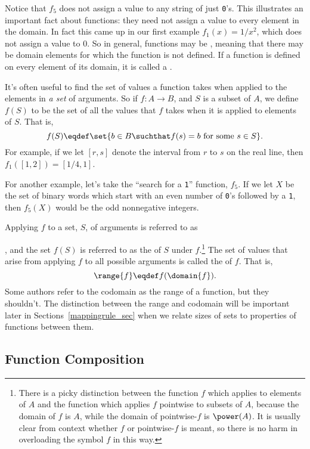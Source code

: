 Notice that $f_5$ does not assign a value to any string of just \texttt{0}'s.
This illustrates an important fact about functions: they need not assign a
value to every element in the domain.  In fact this came up in our first
example $f_1(x)=1/x^2$, which does not assign a value to $0$.  So in
general, functions may be , meaning that there may be domain
elements for which the function is not defined.  If a function is defined
on every element of its domain, it is called a .

It's often useful to find the set of values a function takes when applied
to the elements in \emph{a set} of arguments.  So if $f:A \to B$, and $S$
is a subset of $A$, we define $f(S)$ to be the set of all the values that
$f$ takes when it is applied to elements of $S$.  That is,
\[
f(S) \eqdef \set{b \in B \suchthat f(s) = b \text{ for some } s
  \in S}.
\]
For example, if we let $[r,s]$ denote the interval from $r$ to $s$ on the
real line, then $f_1([1,2]) = [1/4,1]$.

For another example, let's take the ``search for a \texttt{1}''
function, $f_5$.  If we let $X$ be the set of binary words which
start with an even number of \texttt{0}'s followed by a
\texttt{1}, then $f_5(X)$ would be the odd nonnegative integers.

Applying $f$ to a set, $S$, of arguments is referred to as
, and the
set $f(S)$ is referred to as the  of $S$ under
$f$.\footnote{There is a picky distinction between the function $f$ which
  applies to elements of $A$ and the function which applies $f$ pointwise
  to subsets of $A$, because the domain of $f$ is $A$, while the domain of
  pointwise-$f$ is $\power(A)$.  It is usually clear from context whether
  $f$ or pointwise-$f$ is meant, so there is no harm in overloading the
  symbol $f$ in this way.}  The set of values that arise from applying $f$
to all possible arguments is called the  of $f$.  That is,
\[
\range{f} \eqdef f(\domain{f}).
\]
Some authors refer to the codomain as the range of a function, but
they shouldn't.  The distinction between the range and codomain will
be important later in Sections~\ref{mappingrule_sec} when we
relate sizes of sets to properties of functions between them.

\subsection{Function Composition}\label{func_compose_subsec}


